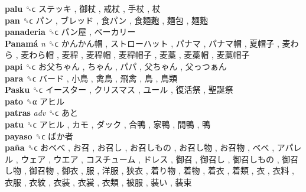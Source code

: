 \textbf{palu} ␝ϲ   ステッキ ,  御杖 ,  戒杖 ,  手杖 ,  杖   \\
\textbf{pan} ␝ϲ   パン ,  ブレッド ,  食パン ,  食麺麭 ,  麺包 ,  麺麭   \\
\textbf{panaderia} ␝ϲ   パン屋 ,  ベーカリー   \\
\textbf{Panamá} \emph{n}  ␝ϲ   かんかん帽 ,  ストローハット ,  パナマ ,  パナマ帽 ,  夏帽子 ,  麦わら ,  麦わら帽 ,  麦稈 ,  麦稈帽 ,  麦稈帽子 ,  麦藁 ,  麦藁帽 ,  麦藁帽子   \\
\textbf{papi} ␝ϲ   お父ちゃん ,  ちゃん ,  パパ ,  父ちゃん ,  父っつぁん   \\
\textbf{para} ␝ϲ   バード ,  小鳥 ,  禽鳥 ,  飛禽 ,  鳥 ,  鳥類   \\
\textbf{Pasku} ␝ϲ   イースター ,  クリスマス ,  ユール ,  復活祭 ,  聖誕祭   \\
\textbf{pato} ␝α   アヒル   \\
\textbf{patras} \emph{adv}  ␝ϲ   あと   \\
\textbf{patu} ␝ϲ   アヒル ,  カモ ,  ダック ,  合鴨 ,  家鴨 ,  間鴨 ,  鴨   \\
\textbf{payaso} ␝ϲ   ばか者   \\
\textbf{paña} ␝ϲ   おべべ ,  お召 ,  お召し ,  お召しもの ,  お召し物 ,  お召物 ,  べべ ,  アパレル ,  ウェア ,  ウエア ,  コスチューム ,  ドレス ,  御召 ,  御召し ,  御召しもの ,  御召し物 ,  御召物 ,  御衣 ,  服 ,  洋服 ,  狭衣 ,  着り物 ,  着物 ,  着衣 ,  着類 ,  衣 ,  衣料 ,  衣服 ,  衣紋 ,  衣装 ,  衣裳 ,  衣類 ,  被服 ,  装い ,  装束   \\
